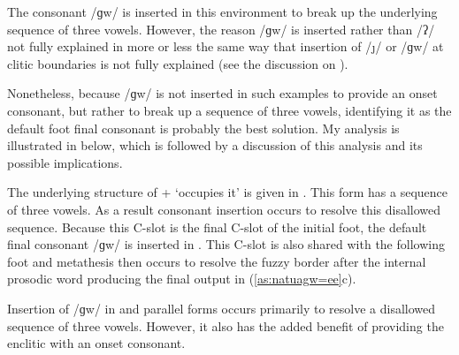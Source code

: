 \begin{exe}
\end{exe}

The consonant /ɡw/ is inserted in this environment
to break up the underlying sequence of three vowels.
However, the reason /ɡw/ is inserted rather than /ʔ/
not fully explained in more or less the same
way that insertion of /\j/ or /ɡw/ at clitic boundaries
is not fully explained (see the discussion on ).

Nonetheless, because /ɡw/ is not inserted in such
examples to provide an onset consonant, but rather
to break up a sequence of three vowels,
identifying it as the default foot final consonant is probably the best solution.
My analysis is illustrated in 
below, which is followed by a discussion of this
analysis and its possible implications.

The underlying structure of  + 
{\ra}  `occupies it' is given in  .
This form has a sequence of three vowels.
As a result consonant insertion occurs to resolve this disallowed sequence.
Because this C-slot is the final C-slot of the initial foot,
the default final consonant /ɡw/ is inserted in .
This C-slot is also shared with the following foot and
metathesis then occurs to resolve the fuzzy border after
the internal prosodic word producing the final output in (\ref{as:natuagw=ee}c).

Insertion of /ɡw/ in  and parallel forms occurs primarily
to resolve a disallowed sequence of three vowels.
However, it also has the added benefit of
providing the enclitic with an onset consonant.

